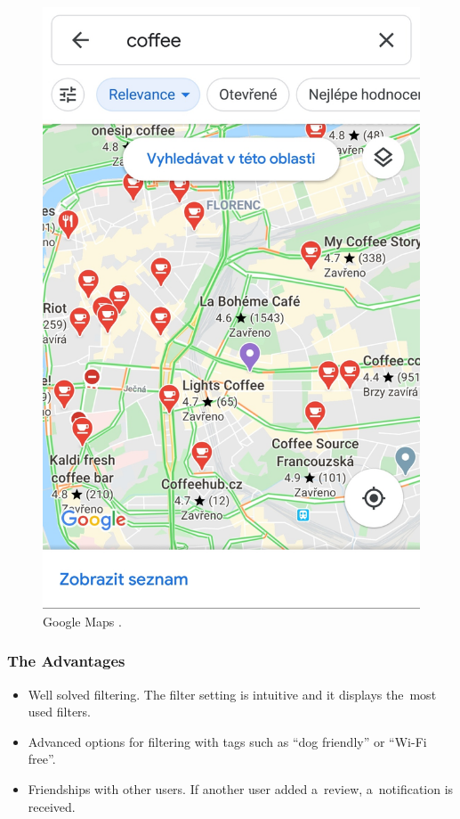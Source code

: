 \begin{figure}[ht]
\begin{minipage}{0.45\linewidth}
        \includegraphics[width=0.75\linewidth]{img/analysis/app-gmaps.jpg}
        \caption{Google Maps \cite{app-google-maps}.}
        \label{fig:google-maps}
    \end{minipage}
\end{figure}

\subsubsection{The Advantages}
\begin{itemize}
    \item Well solved filtering. The filter setting is intuitive and it displays the~most used filters. 
    \item Advanced options for filtering with tags such as ``dog friendly'' or ``Wi-Fi free''.
    \item Friendships with other users. If another user added a~review, a~notification is received.
\end{itemize}

